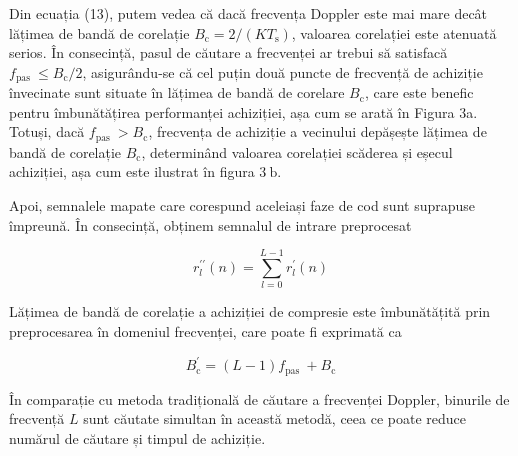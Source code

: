 \documentclass[10pt]{report}
\begin{document}
Din ecuația (13), putem vedea că dacă frecvența Doppler este mai mare decât lățimea de bandă de corelație \(B_{\mathrm{c}}=2 /\left(K T_{\mathrm{s}}\right)\), valoarea corelației este atenuată serios. În consecință, pasul de căutare a frecvenței ar trebui să satisfacă \(f_{\text {pas }} \leq B_{\mathrm{c}} / 2\), asigurându-se că cel puțin două puncte de frecvență de achiziție învecinate sunt situate în lățimea de bandă de corelare \( B_{\mathrm{c}}\), care este benefic pentru îmbunătățirea performanței achiziției, așa cum se arată în Figura 3a. Totuși, dacă \(f_{\text {pas }}>B_{\mathrm{c}}\), frecvența de achiziție a vecinului depășește lățimea de bandă de corelație \(B_{\mathrm{c}}\), determinând valoarea corelației scăderea și eșecul achiziției, așa cum este ilustrat în figura \(3 \mathrm{~b}\).

Apoi, semnalele mapate care corespund aceleiași faze de cod sunt suprapuse împreună. În consecință, obținem semnalul de intrare preprocesat


\begin{equation}
    r_{l}^{\prime \prime}(n)=\sum_{l=0}^{L-1} r_{l}^{\prime}(n)
\end{equation}

Lățimea de bandă de corelație a achiziției de compresie este îmbunătățită prin preprocesarea în domeniul frecvenței, care poate fi exprimată ca


\begin{equation}
    B_{\mathrm{c}}^{\prime}=(L-1) f_{\text {pas }}+B_{\mathrm{c}}
\end{equation}


În comparație cu metoda tradițională de căutare a frecvenței Doppler, binurile de frecvență \(L\) sunt căutate simultan în această metodă, ceea ce poate reduce numărul de căutare și timpul de achiziție.
\end{document}
